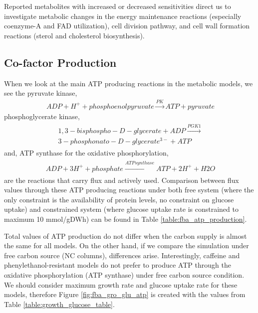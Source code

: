 Reported metabolites with increased or decreased sensitivities direct us to investigate metabolic changes in the energy maintenance reactions (especially coenzyme-A and FAD utilization), cell division pathway, and cell wall formation reactions (sterol and cholesterol biosynthesis).

\subsection{Co-factor Production}
When we look at the main ATP producing reactions in the metabolic models, we see the pyruvate kinase,
\begin{align}
\ ADP + H^+ + phosphoenolpyruvate \xrightarrow{PK} ATP + pyruvate
\end{align}
phosphoglycerate kinase,
\begin{align}
\begin{split}
\ 1,3-bisphospho-D-glycerate + ADP  \xrightarrow{PGK1} \\
\ 3-phosphonato-D-glycerate^{3-} + ATP
\end{split}
\end{align}
and, ATP synthase for the oxidative phosphorylation,
\begin{align}
\begin{split}
\ ADP + 3 H^+ + phosphate   \xrightarrow{ATP synthase}  ATP + 2 H^+ + H2O
\end{split}
\end{align}
are the reactions that carry flux and actively used. Comparison between flux values through these ATP producing reactions under both free system (where the only constraint is the availability of protein levels, no constraint on glucose uptake) and constrained system (where glucose uptake rate is constrained to maximum 10 mmol/gDWh) can be found in Table \ref{table:fba_atp_production}.

Total values of ATP production do not differ when the carbon supply is almost the same for all models. On the other hand, if we compare the simulation under free carbon source (NC columns), differences arise. Interestingly, caffeine and phenylethanol-resistant models do not prefer to produce ATP through the oxidative phosphorylation (ATP synthase) under free carbon source condition. We should consider maximum growth rate and glucose uptake rate for these models, therefore Figure \ref{fig:fba_gro_glu_atp} is created with the values from Table \ref{table:growth_glucose_table}.

\vspace{0.5cm}


